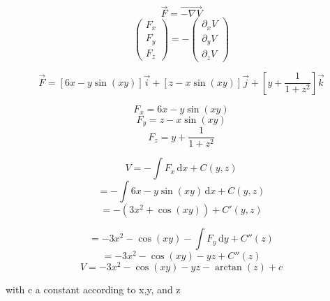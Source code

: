 \documentclass[11pt]{article}
\begin{document}
\[ \vec{F} = \vec{- \nabla V} \]
\[ \begin{pmatrix}
F_x \\ F_y \\ F_z
\end{pmatrix}= - 
\begin{pmatrix}
\partial_x V \\
\partial_y V \\
\partial_z V
\end{pmatrix}\]

\[ \vec{F} = 
[6x - y \sin(xy)]\vec{i} + 
[z - x\sin(xy)]\vec{j} + 
\left[y+\frac{1}{1+z^2}\right]\vec{k} \]

\[ F_x = 6x - y \sin(xy) \]
\[ F_y = z - x\sin(xy) \]
\[ F_z = y+\frac{1}{1+z^2} \]


\[ V = - \int F_x  \, \mathrm{d}x + C(y,z) \]
\[ =  - \int 6x - y \sin(xy)  \, \mathrm{d}x + C(y,z) \]
\[ = - (3x^2 + \cos(xy)) + C'(y,z)\]

\[ = -3x^2 - \cos(xy) - \int  F_y  \, \mathrm{d}y + C''(z) \]
\[ =  -3x^2 - \cos(xy) - yz + C''(z) \]
\[ V = -3x^2 - \cos(xy) - yz - \arctan(z) + c \]

with c a constant according to x,y, and z
\end{document}

